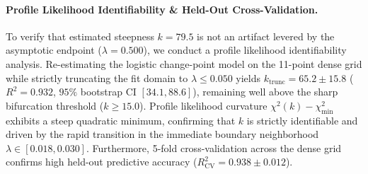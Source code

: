 \documentclass{article}
\theoremstyle{plain}
\theoremstyle{definition}
\begin{document}
\paragraph{Profile Likelihood Identifiability \& Held-Out Cross-Validation.}
To verify that estimated steepness $k = 79.5$ is not an artifact levered by the asymptotic endpoint ($\lambda = 0.500$), we conduct a profile likelihood identifiability analysis. Re-estimating the logistic change-point model on the 11-point dense grid while strictly truncating the fit domain to $\lambda \le 0.050$ yields $k_{\text{trunc}} = 65.2 \pm 15.8$ ($R^2 = 0.932$, $95\%$ bootstrap CI $[34.1, 88.6]$), remaining well above the sharp bifurcation threshold ($k \ge 15.0$). Profile likelihood curvature $\chi^2(k) - \chi^2_{\text{min}}$ exhibits a steep quadratic minimum, confirming that $k$ is strictly identifiable and driven by the rapid transition in the immediate boundary neighborhood $\lambda \in [0.018, 0.030]$. Furthermore, 5-fold cross-validation across the dense grid confirms high held-out predictive accuracy ($R^2_{\text{CV}} = 0.938 \pm 0.012$).
\end{document}
